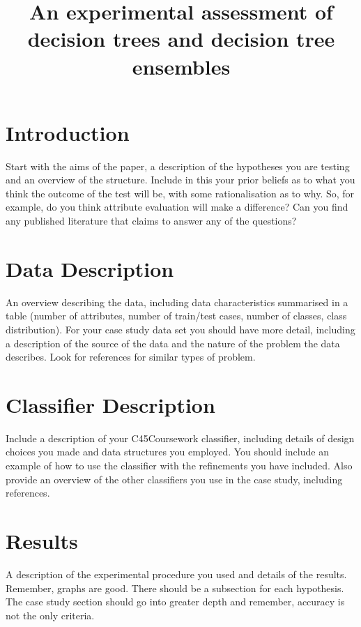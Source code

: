 \documentclass{cmppgr}
\title{An experimental assessment of decision trees and decision tree ensembles}
\begin{document}
\maketitle

\section {Introduction}

Start with the aims of the paper, a description of the hypotheses you are testing and an overview of the structure. Include in this your prior beliefs as to what you think the outcome of the test will be, with some rationalisation as to why. So, for example, do you think attribute evaluation will make a difference? Can you find any published literature that claims to answer any of the questions?

\section{Data Description}

An overview describing the data, including data characteristics summarised in a table (number of attributes, number of train/test cases, number of classes, class distribution). For your case study data set you should have more detail, including a description of the source of the data and the nature of the problem the data describes. Look for references for similar types of problem.


\section {Classifier Description}

Include a description of your C45Coursework classifier, including details of design choices you made and data structures you employed. You should include an example of how to use the classifier with the refinements you have included. Also provide an overview of the other classifiers you use in the case study, including references.

\section {Results} 

A description of the experimental procedure you used and details of the results. Remember, graphs are good. There should be a subsection for each hypothesis. The case study section should go into greater depth and remember, accuracy is not the only criteria.
\end{document}
